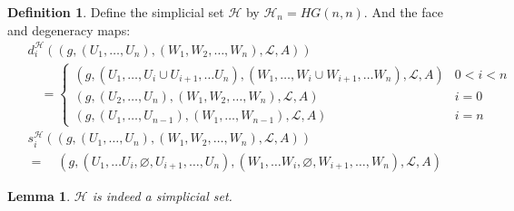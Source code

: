 \documentclass[12pt]{article}
\newtheorem{lemma}[theorem]{Lemma}
\theoremstyle{definition}
\newtheorem{definition}[theorem]{Definition}
\newcommand{\1}{\mathbbm{1}}
\renewcommand{\L}{\mathcal{L}}
\renewcommand{\H}{\mathcal{H}}
\begin{document}
\begin{definition}
Define the simplicial set $\H$ by $\H_n = HG(n,n)$. And the face and degeneracy maps:
\begin{align*}
    &d_i^{\H} ((g, (U_1, \dots, U_n), (W_1, W_2, \dots, W_n), \L, A))\\
    &\quad=\begin{cases}
        (g, (U_1, \dots, U_i\cup U_{i+1}, \dots U_n), (W_1, \dots, W_i\cup W_{i+1}, \dots W_n), \L, A) & 0 < i < n\\
        (g, (U_2, \dots, U_n), (W_1, W_2, \dots, W_n), \L, A) & i = 0\\
        (g, (U_1, \dots, U_{n-1}), (W_1, \dots, W_{n-1}), \L, A) & i = n
    \end{cases}\\
    \hspace{5pt}
    &s_i^{\H}((g, (U_1, \dots, U_n), (W_1, W_2, \dots, W_n), \L, A))\\
    &=\quad (g, (U_1, \dots U_i, \varnothing, U_{i+1}, \dots, U_n), (W_1, \dots W_i, \varnothing, W_{i+1}, \dots, W_n), \L, A)
\end{align*}
\end{definition}

\begin{lemma}
    $\H$ is indeed a simplicial set.
\end{lemma}
\end{document}
